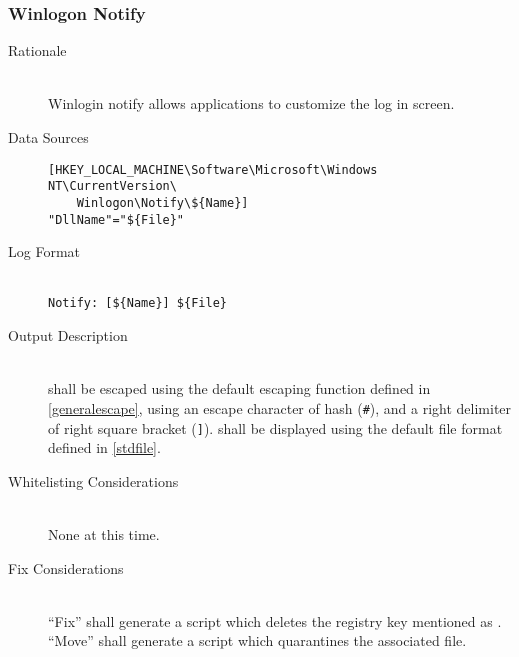 \subsubsection{Winlogon Notify}
\begin{description}
\item[Rationale] \hfill \\
Winlogin notify allows applications to customize the log in screen.
\item[Data Sources] \hfill
\vspace{-\baselineskip}
\begin{verbatim}
[HKEY_LOCAL_MACHINE\Software\Microsoft\Windows NT\CurrentVersion\
    Winlogon\Notify\${Name}]
"DllName"="${File}"
\end{verbatim}
\item[Log Format] \hfill \\
\verb|Notify: [${Name}] ${File}|
\item[Output Description] \hfill \\
 shall be escaped using the default escaping function defined in
\ref{generalescape}, using an escape character of hash (\verb|#|), and a right
delimiter of right square bracket (\verb|]|). \var{File} shall be displayed
using the default file format defined in \ref{stdfile}.
\item[Whitelisting Considerations] \hfill \\
None at this time.
\item[Fix Considerations] \hfill \\
``Fix'' shall generate a script which deletes the registry key mentioned as
\var{Name}. ``Move'' shall generate a script which quarantines the associated
file.
\end{description}


